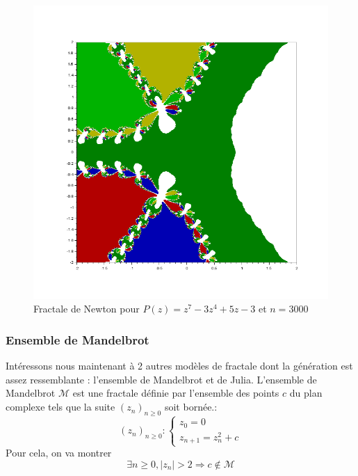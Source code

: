 \begin{figure}[h]
\begin{minipage}[b]{0.3\textwidth}
                    \includegraphics[width=\textwidth]{images/fractale_newton_z7-3z4+5z-3.png}
                    \caption{Fractale de Newton pour $P(z) = z^7-3z^4+5z-3$ et $n=3000$}
                    \label{fig:fractale_newton4}
                \end{minipage}
            \end{figure}

            
         \subsubsection{Ensemble de Mandelbrot}
         Intéressons nous maintenant à 2 autres modèles de fractale dont la génération est assez ressemblante : l'ensemble de Mandelbrot et de Julia.
         L'ensemble de Mandelbrot $\mathcal{M}$ est une fractale définie par l'ensemble des points $c$ du plan complexe tels que la suite $(z_n)_{n\geq 0}$ soit bornée.:
         $$(z_n)_{n\geq 0} :
            \left\{
                \begin{array}{ll}
                    z_0=0\\
                    z_{n+1}=z_n^2 + c                    
                \end{array}
            \right.
         $$
         Pour cela, on va montrer
         $$\exists n \geq 0, |z_n| > 2 \Rightarrow c \notin \mathcal{M}$$
        
